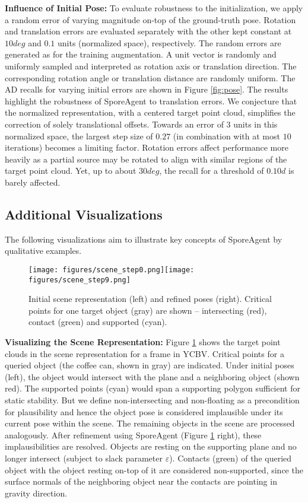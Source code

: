 \documentclass[10pt,twocolumn,letterpaper]{article}
\begin{document}
\textbf{Influence of Initial Pose: }To evaluate robustness to the initialization, we apply a random error of varying magnitude on-top of the ground-truth pose. Rotation and translation errors are evaluated separately with the other kept constant at $10deg$ and $0.1$ units (normalized space), respectively. The random errors are generated as for the training augmentation. A unit vector is randomly and uniformly sampled and interpreted as rotation axis or translation direction. The corresponding rotation angle or translation distance are randomly uniform. %
The AD recalls for varying initial errors are shown in Figure \ref{fig:pose}. The results highlight the robustness of SporeAgent to translation errors. We conjecture that the normalized representation, with a centered target point cloud, simplifies the correction of solely translational offsets. Towards an error of $3$ units in this normalized space, the largest step size of $0.27$ (in combination with at most $10$ iterations) becomes a limiting factor. Rotation errors affect performance more heavily as a partial source may be rotated to align with similar regions of the target point cloud. Yet, up to about $30deg$, the recall for a threshold of $0.10d$ is barely affected.


\subsection{Additional Visualizations}\label{sec:visualization}
The following visualizations aim to illustrate key concepts of SporeAgent by qualitative examples.

\begin{figure}
    \centering
    \texttt{[image: figures/scene\_step0.png]}\texttt{[image: figures/scene\_step9.png]}
    \caption{Initial scene representation (left) and refined poses (right). Critical points for one target object (gray) are shown -- intersecting (red), contact (green) and supported (cyan).}
    \label{fig:scene}
\end{figure}

\textbf{Visualizing the Scene Representation: }Figure \ref{fig:scene} shows the target point clouds in the scene representation for a frame in YCBV. Critical points for a queried object (the coffee can, shown in gray) are indicated. Under initial poses (left), the object would intersect with the plane and a neighboring object (shown red). The supported points (cyan) would span a supporting polygon sufficient for static stability. But we define non-intersecting and non-floating as a precondition for plausibility and hence the object pose is considered implausible under its current pose within the scene. The remaining objects in the scene are processed analogously. %
After refinement using SporeAgent (Figure \ref{fig:scene} right), these implausibilities are resolved. Objects are resting on the supporting plane and no longer intersect (subject to slack parameter $\varepsilon$). Contacts (green) of the queried object with the object resting on-top of it are considered non-supported, since the surface normals of the neighboring object near the contacts are pointing in gravity direction.
\end{document}

